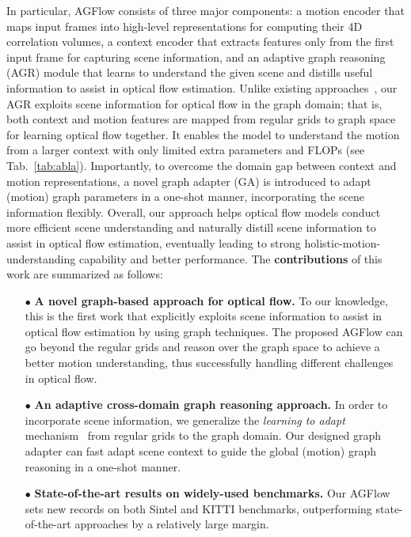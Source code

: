\documentclass[letterpaper]{article} %
\begin{document}
In particular, AGFlow consists of three major components: a motion encoder that maps input frames into high-level representations for computing their 4D correlation volumes, a context encoder that extracts features only from the first input frame for capturing scene information, and an adaptive graph reasoning (AGR) module that learns to understand the given scene and distills useful information to assist in optical flow estimation. Unlike existing approaches~\cite{Teed2020RAFTRA,Jiang2021LearningOF}, our AGR exploits scene information for optical flow in the graph domain; that is, both context and motion features are mapped from regular grids to graph space for learning optical flow together. It enables the model to understand the motion from a larger context with only limited extra parameters and FLOPs (see Tab.~\ref{tab:abla}). Importantly, to overcome the domain gap between context and motion representations, a novel graph adapter (GA) is introduced to adapt (motion) graph parameters in a one-shot manner, incorporating the scene information flexibly.  Overall, our approach helps optical flow models conduct more efficient scene understanding and naturally distill scene information to assist in optical flow estimation, eventually leading to strong holistic-motion-understanding capability and better performance.  The {\bfseries contributions} of this work are summarized as follows:
\begin{itemize}
	\item[$\bullet$]
	{\bfseries A novel graph-based approach for optical flow.} To our knowledge, this is the first work that explicitly exploits scene information to assist in optical flow estimation by using graph techniques. The proposed AGFlow can go beyond the regular grids and reason over the graph space to achieve a better motion understanding, thus successfully handling different challenges in optical flow.

	\item[$\bullet$]
	{\bfseries An adaptive cross-domain graph reasoning approach.} In order to incorporate scene information, we generalize the \emph{learning to adapt} mechanism~\cite{Bertinetto2016LearningFO} from regular grids to the graph domain. Our designed graph adapter can fast adapt scene context to guide the global (motion) graph reasoning in a one-shot manner.

	\item[$\bullet$]
	{\bfseries State-of-the-art results on widely-used benchmarks.} Our AGFlow sets new records on both Sintel and KITTI benchmarks, outperforming state-of-the-art approaches by a relatively large margin.
\end{itemize}
\end{document}
